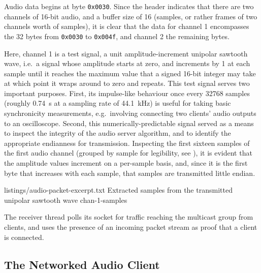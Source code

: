 Audio data begins at byte \texttt{0x0030}.
Since the header indicates that there are two channels of 16-bit audio, and a
buffer size of 16 (samples, or rather frames of two channels worth of samples),
it is clear that the data for channel 1 encompasses the 32 bytes from
\texttt{0x0030} to \texttt{0x004f}, and channel 2 the remaining bytes.

Here, channel 1 is a test signal, a unit amplitude-increment unipolar sawtooth
wave, i.e.\ a signal whose amplitude starts at zero, and increments by 1 at each
sample until it reaches the maximum value that a signed 16-bit integer may take
\textemdash{}  \textemdash{} at which point it wraps around to
zero and repeats.
This test signal serves two important purposes.
First, its impulse-like behaviour once every \num{32768} samples (roughly
\qty{.74}{\s} at a sampling rate of \qty{44.1}{\kHz}) is useful for taking basic
synchronicity measurements, e.g.\ involving connecting two clients' audio
outputs to an oscilloscope.
Second, this numerically-predictable signal served as a means to inspect the
integrity of the audio server algorithm, and to identify the appropriate
endianness for transmission.
Inspecting the first sixteen samples of the first audio channel (grouped
by sample for legibility, see ), it is evident
that the amplitude values increment on a per-sample basis, and, since it is the
first byte that increases with each sample, that samples are transmitted little
endian.

{listings/audio-packet-excerpt.txt}
{Extracted samples from the transmitted unipolar sawtooth wave}
{chan-1-samples}

The receiver thread polls its socket for traffic reaching the multicast group
from clients, and uses the presence of an incoming packet stream as proof that
a client is connected.

\subsection{The Networked Audio Client}\label{subsec:networked-audio-client}

